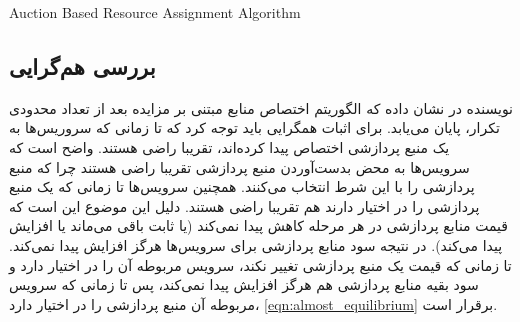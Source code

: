       \begin{latin}
        \begin{algorithm}[tp]
          \caption{Auction ‌Based Resource Assignment Algorithm}
          \label{alg:one_to_one:auction}
          \begin{algorithmic}[1]
             \label{state:auction_iteration:price_initialization}
              \EndFor
                 \label{state:service_iteration:check_assignment}
                   \label{state:service_iteration:find_max}
                   \label{state:service_iteration:compute_new_bid}
                   \label{state:service_iteration:send_bid}
                \EndIf
              \EndFor
                \EndIf
              \EndFor
            \EndWhile
          \end{algorithmic}
        \end{algorithm}
      \end{latin}

    \subsection{بررسی هم‌گرایی}
      نویسنده در \cite{auction_algorithms_bertsekas} نشان داده که الگوریتم اختصاص منابع مبتنی بر مزایده بعد از تعداد محدودی تکرار، پایان می‌یابد.
      برای اثبات همگرایی باید توجه کرد که تا زمانی که سروریس‌ها به یک منبع پردازشی اختصاص پیدا کرده‌اند، تقریبا راضی هستند.
      واضح است که سرویس‌ها به محض بدست‌آوردن منبع پردازشی تقریبا راضی هستند چرا که منبع پردازشی را با این شرط انتخاب می‌کنند.
      همچنین سرویس‌ها تا زمانی که یک منبع پردازشی را در اختیار دارند هم تقریبا راضی هستند.
      دلیل این موضوع این است که قیمت منابع پردازشی در هر مرحله کاهش پیدا نمی‌کند (یا ثابت باقی می‌ماند یا افزایش پیدا می‌کند).
      در نتیجه سود منابع پردازشی برای سرویس‌ها هرگز افزایش پیدا نمی‌کند.
      تا زمانی که قیمت یک منبع پردازشی تغییر نکند، سرویس مربوطه آن را در اختیار دارد و سود بقیه منابع پردازشی هم هرگز افزایش پیدا نمی‌کند،‌ پس تا زمانی که سرویس مربوطه آن منبع پردازشی را در اختیار دارد، \cref{eqn:almost_equilibrium} برقرار است.

